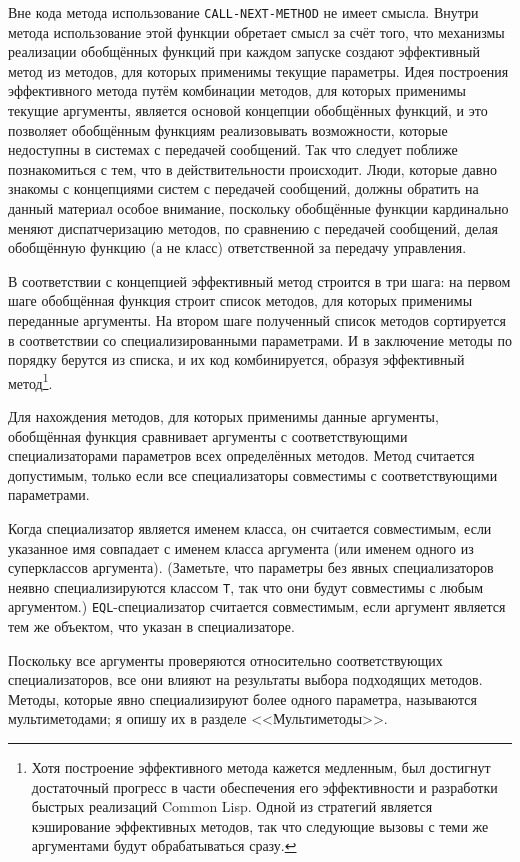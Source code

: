Вне кода метода использование \lstinline{CALL-NEXT-METHOD} не имеет смысла.  Внутри метода
использование этой функции обретает смысл за счёт того, что механизмы реализации
обобщённых функций при каждом запуске создают эффективный метод из методов, для которых
применимы текущие параметры.  Идея построения эффективного метода путём комбинации
методов, для которых применимы текущие аргументы, является основой концепции обобщённых
функций, и это позволяет обобщённым функциям реализовывать возможности, которые недоступны
в системах с передачей сообщений.  Так что следует поближе познакомиться с тем, что в
действительности происходит.  Люди, которые давно знакомы с концепциями систем с передачей
сообщений, должны обратить на данный материал особое внимание, поскольку обобщённые функции
кардинально меняют диспатчеризацию методов, по сравнению с передачей сообщений, делая
обобщённую функцию (а не класс) ответственной за передачу управления.

В соответствии с концепцией эффективный метод строится в три шага: на первом шаге
обобщённая функция строит список методов, для которых применимы переданные аргументы.  На
втором шаге полученный список методов сортируется в соответствии со специализированными
параметрами.  И в заключение методы по порядку берутся из списка, и их код комбинируется,
образуя эффективный метод\footnote{Хотя построение эффективного метода кажется медленным,
  был достигнут достаточный прогресс в части обеспечения его эффективности и разработки
  быстрых реализаций Common Lisp.  Одной из стратегий является кэширование эффективных
  методов, так что следующие вызовы с теми же аргументами будут обрабатываться сразу.}.

Для нахождения методов, для которых применимы данные аргументы, обобщённая функция
сравнивает аргументы с соответствующими специализаторами параметров всех определённых
методов.  Метод считается допустимым, только если все специализаторы совместимы с
соответствующими параметрами.

Когда специализатор является именем класса, он считается совместимым, если указанное имя
совпадает с именем класса аргумента (или именем одного из суперклассов аргумента).
(Заметьте, что параметры без явных специализаторов неявно специализируются классом
\lstinline{T}, так что они будут совместимы с любым аргументом.)  \lstinline{EQL}-специализатор
считается совместимым, если аргумент является тем же объектом, что указан в
специализаторе.

Поскольку все аргументы проверяются относительно соответствующих специализаторов, все они
влияют на результаты выбора подходящих методов.  Методы, которые явно специализируют более
одного параметра, называются мультиметодами; я опишу их в разделе <<Мультиметоды>>.

